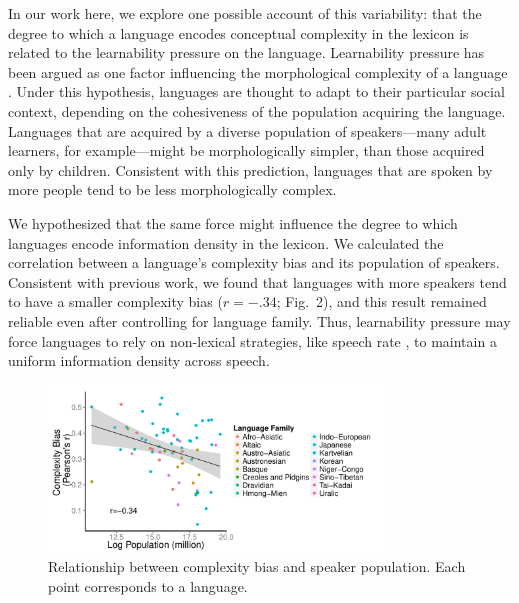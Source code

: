 \documentclass{evolang11}
\begin{document}
In our work here, we explore one possible account of this variability: that the degree to which a language encodes conceptual complexity in the lexicon is related to the learnability pressure on the language. Learnability pressure has been argued as one factor influencing the morphological complexity of a language \cite{lupyan2010language}. Under this hypothesis, languages are thought to adapt to their particular social context, depending on the cohesiveness of the population acquiring the language. Languages that are  acquired by a diverse population of speakers---many adult learners, for example---might be morphologically simpler, than those acquired only by children. Consistent with this prediction, languages that are spoken by more people tend to be less morphologically complex.

We hypothesized that the same force might influence the degree to which languages encode information density in the lexicon. We calculated the correlation between a language's complexity bias and its population of speakers. Consistent with previous work, we found that languages with more speakers tend to have a smaller complexity bias ($r = -.34$;  Fig.\ 2), and this result remained reliable even after controlling for language family. Thus, learnability pressure may force languages to rely on non-lexical strategies, like speech rate \cite{pellegrino2011across}, to maintain a uniform information density across speech.


\begin{figure}
\includegraphics[width=3.5in]{Fig2.pdf}
\caption{Relationship between complexity bias and speaker population. Each point corresponds to a language. \label{fig2}}
\end{figure}





{\footnotesize  }
\end{document}
